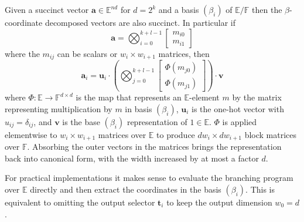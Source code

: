 \documentclass[11pt,letterpaper,usenames,dvipsnames]{article}
\begin{document}
\begin{theorem}
Given a succinct vector $\mathbf{a} \in \mathbb{E}^{nd}$ for $d= 2^k$ and a basis $(\beta_i)$ of $\mathbb{E}/\mathbb{F}$ then the $\beta$-coordinate decomposed vectors are also succinct. In particular if
\[
\mathbf{a} = \bigotimes_{i=0}^{k+l-1} 
\begin{bmatrix}
m_{i0} \\ m_{i1}
\end{bmatrix}
\]
where the $m_{ij}$ can be scalars or $w_i \times w_{i+1}$ matrices, then
\[
\mathbf{a}_i = \mathbf{u}_i \cdot
\left(
\bigotimes_{j=0}^{k+l-1} 
\begin{bmatrix}
\Phi (m_{j0}) \\ \Phi(m_{j1})
\end{bmatrix}
\right)
\cdot \mathbf{v}
\]
where $\Phi : \mathbb{E} \to \mathbb{F}^{d \times d}$ is the map that represents an $\mathbb{E}$-element $m$ by the matrix representing multiplication by $m$ in basis $(\beta_i)$, $\mathbf{u}_i$ is the one-hot vector with $u_{ij} = \delta_{ij}$, and $\mathbf{v}$ is the base $(\beta_i)$ representation of $1 \in \mathbb{E}$. $\Phi$ is applied elementwise to $w_i \times w_{i+1}$ matrices over $\mathbb{E}$ to produce $dw_i \times dw_{i+1}$ block matrices over $\mathbb{F}$. Absorbing the outer vectors in the matrices brings the representation back into canonical form, with the width increased by at most a factor $d$.
\end{theorem}

For practical implementations it makes sense to evaluate the branching program over $\mathbb{E}$ directly and then extract the coordinates in the basis $(\beta_i)$. This is equivalent to omitting the output selector $\mathbf{t}_i$ to keep the output dimension $w_0 = d$.
\end{document}

